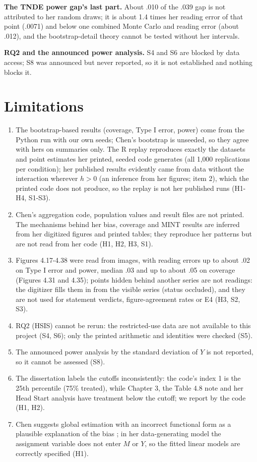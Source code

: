 \textbf{The TNDE power gap's last part.} About .010 of the .039 gap is not attributed to her random draws; it is about 1.4 times her reading error of that point (.0071) and below one combined Monte Carlo and reading error (about .012), and the bootstrap-detail theory cannot be tested without her intervals.

\textbf{RQ2 and the announced power analysis.} S4 and S6 are blocked by data access; S8 was announced but never reported, so it is not established and nothing blocks it.

\section{Limitations}\label{sec:limitations}

\begin{enumerate}[leftmargin=1.5em]
\item\label{lim:0} The bootstrap-based results (coverage, Type I error, power) come from the Python run with our own seeds; Chen's bootstrap is unseeded, so they agree with hers on summaries only. The R replay reproduces exactly the datasets and point estimates her printed, seeded code generates (all 1,000 replications per condition); her published results evidently came from data without the interaction wherever $h > 0$ (an inference from her figures; item 2), which the printed code does not produce, so the replay is not her published runs (H1-H4, S1-S3).
\item\label{lim:1} Chen's aggregation code, population values and result files are not printed. The mechanisms behind her bias, coverage and MINT results are inferred from her digitized figures and printed tables; they reproduce her patterns but are not read from her code (H1, H2, H3, S1).
\item\label{lim:2} Figures 4.17-4.38 were read from images, with reading errors up to about .02 on Type I error and power, median .03 and up to about .05 on coverage (Figures 4.31 and 4.35); points hidden behind another series are not readings: the digitizer fills them in from the visible series (status occluded), and they are not used for statement verdicts, figure-agreement rates or E4 (H3, S2, S3).
\item\label{lim:3} RQ2 (HSIS) cannot be rerun: the restricted-use data are not available to this project (S4, S6); only the printed arithmetic and identities were checked (S5).
\item\label{lim:4} The announced power analysis by the standard deviation of $Y$ is not reported, so it cannot be assessed (S8).
\item\label{lim:5} The dissertation labels the cutoffs inconsistently: the code's index 1 is the 25th percentile (75\% treated), while Chapter 3, the Table 4.8 note and her Head Start analysis have treatment below the cutoff; we report by the code (H1, H2).
\item\label{lim:6} Chen suggests global estimation with an incorrect functional form as a plausible explanation of the bias \citep[printed p.~147]{chen2021}; in her data-generating model the assignment variable does not enter $M$ or $Y$, so the fitted linear models are correctly specified (H1).
\end{enumerate}
